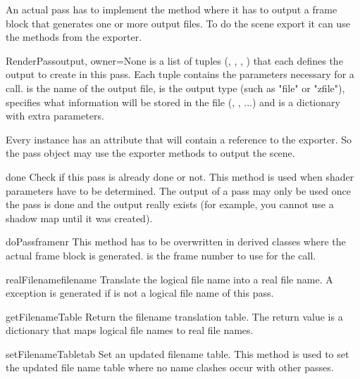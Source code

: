 An actual pass has to implement the  method where it 
has to output a frame block that generates one or more output files.
To do the scene export it can use the methods from the exporter.

\begin{classdesc}{RenderPass}{output, owner=None}
 is a list of tuples (, , , 
) that each defines the output to create in this pass. 
Each tuple contains the parameters necessary for a  call.
 is the name of the output file,  is the output type
(such as "file" or "zfile"),  specifies what information will
be stored in the file (, , ...) and 
is a dictionary with extra parameters.

Every  instance has an attribute  that
will contain a reference to the exporter. So the pass object may use
the exporter methods to output the scene.
\end{classdesc}

\begin{methoddesc}{done}{}
Check if this pass is already done or not. This method is used when
shader parameters have to be determined. The output of a pass may
only be used once the pass is done and the output really exists (for
example, you cannot use a shadow map until it was created).
\end{methoddesc}

\begin{methoddesc}{doPass}{framenr}
This method has to be overwritten in derived classes where the actual
frame block is generated.  is the frame number to use
for the  call.
\end{methoddesc}

\begin{methoddesc}{realFilename}{filename}
Translate the logical file name  into a real file name.
A  exception is generated if  is
not a logical file name of this pass.
\end{methoddesc}

\begin{methoddesc}{getFilenameTable}{}
Return the filename translation table. The return value is a dictionary
that maps logical file names to real file names.
\end{methoddesc}

\begin{methoddesc}{setFilenameTable}{tab}
Set an updated filename table. This method is used to set the updated
file name table where no name clashes occur with other passes.
\end{methoddesc}

